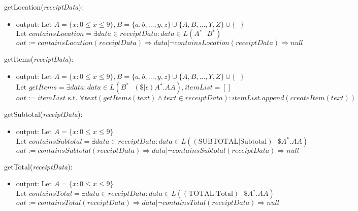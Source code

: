 \documentclass[12pt, titlepage]{article}
\begin{document}
\noindent getLocation(\textit{receiptData}):
\begin{itemize}
  \item output: $\text{Let } A=\{x : 0 \leq x \leq 9\}, B=\{a,b,\dots,y,z\}\cup\{A,B,\dots,Y,Z\}\cup\{\text{ }\}$ \\
                $\text{Let } containsLocation=\exists data \in receiptData : data \in L(A{}^\ast \text{ } B{}^\ast)$ \\
                $out := containsLocation(receiptData) \Rightarrow data | \neg containsLocation(receiptData) \Rightarrow null$
\end{itemize}

\noindent getItems(\textit{receiptData}):
\begin{itemize}
  \item output: $\text{Let } A=\{x : 0 \leq x \leq 9\}, B=\{a,b,\dots,y,z\}\cup\{A,B,\dots,Y,Z\}\cup\{\text{ }\}$ \\
                $\text{Let } getItems=\exists data : data \in L(B^\ast \text{ } (\$|\epsilon)A{}^\ast.AA), itemList=[]$ \\
                $out := itemList \text{ s.t. } \forall text(getItems(text) \land text \in receiptData) : itemList.append(createItem(text))$
\end{itemize}

\noindent getSubtotal(\textit{receiptData}):
\begin{itemize}
  \item output: $\text{Let } A=\{x : 0 \leq x \leq 9\}$ \\
                $\text{Let } containsSubtotal=\exists data \in receiptData : data \in L((\text{SUBTOTAL}|\text{Subtotal})\text{ }\$A{}^\ast.AA)$ \\
                $out := containsSubtotal(receiptData) \Rightarrow data | \neg containsSubtotal(receiptData) \Rightarrow null$
\end{itemize}

\noindent getTotal(\textit{receiptData}):
\begin{itemize}
  \item output: $\text{Let } A=\{x : 0 \leq x \leq 9\}$ \\
                $\text{Let } containsTotal=\exists data \in receiptData : data \in L((\text{TOTAL}|\text{Total})\text{ }\$A{}^\ast.AA)$ \\
                $out := containsTotal(receiptData) \Rightarrow data | \neg containsTotal(receiptData) \Rightarrow null$
\end{itemize}
\end{document}
